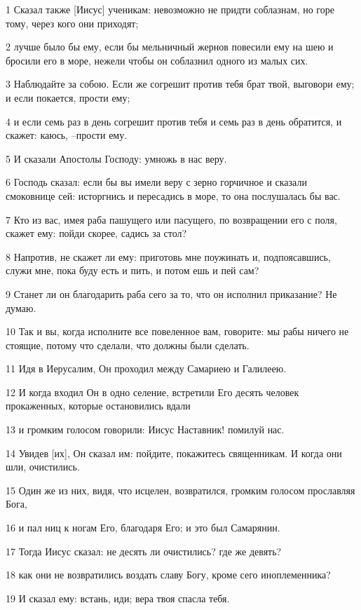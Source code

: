 \par 1 Сказал также [Иисус] ученикам: невозможно не придти соблазнам, но горе тому, через кого они приходят;
\par 2 лучше было бы ему, если бы мельничный жернов повесили ему на шею и бросили его в море, нежели чтобы он соблазнил одного из малых сих.
\par 3 Наблюдайте за собою. Если же согрешит против тебя брат твой, выговори ему; и если покается, прости ему;
\par 4 и если семь раз в день согрешит против тебя и семь раз в день обратится, и скажет: каюсь, --прости ему.
\par 5 И сказали Апостолы Господу: умножь в нас веру.
\par 6 Господь сказал: если бы вы имели веру с зерно горчичное и сказали смоковнице сей: исторгнись и пересадись в море, то она послушалась бы вас.
\par 7 Кто из вас, имея раба пашущего или пасущего, по возвращении его с поля, скажет ему: пойди скорее, садись за стол?
\par 8 Напротив, не скажет ли ему: приготовь мне поужинать и, подпоясавшись, служи мне, пока буду есть и пить, и потом ешь и пей сам?
\par 9 Станет ли он благодарить раба сего за то, что он исполнил приказание? Не думаю.
\par 10 Так и вы, когда исполните все повеленное вам, говорите: мы рабы ничего не стоящие, потому что сделали, что должны были сделать.
\par 11 Идя в Иерусалим, Он проходил между Самариею и Галилеею.
\par 12 И когда входил Он в одно селение, встретили Его десять человек прокаженных, которые остановились вдали
\par 13 и громким голосом говорили: Иисус Наставник! помилуй нас.
\par 14 Увидев [их], Он сказал им: пойдите, покажитесь священникам. И когда они шли, очистились.
\par 15 Один же из них, видя, что исцелен, возвратился, громким голосом прославляя Бога,
\par 16 и пал ниц к ногам Его, благодаря Его; и это был Самарянин.
\par 17 Тогда Иисус сказал: не десять ли очистились? где же девять?
\par 18 как они не возвратились воздать славу Богу, кроме сего иноплеменника?
\par 19 И сказал ему: встань, иди; вера твоя спасла тебя.
